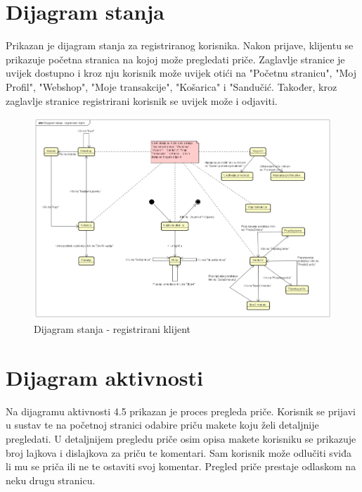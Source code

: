 	\section{Dijagram stanja}
	
		Prikazan je dijagram stanja za registriranog korisnika. Nakon prijave, klijentu se prikazuje početna stranica na kojoj može pregledati priče. Zaglavlje stranice je uvijek dostupno i kroz nju korisnik može uvijek otići na "Početnu stranicu", "Moj Profil", "Webshop", "Moje transakcije", "Košarica" i "Sandučić. Također, kroz zaglavlje stranice registrirani korisnik se uvijek može i odjaviti.
		
		
		\begin{figure}[!h]
			\centering
			\includegraphics[width=1\linewidth]{slike/Dijagram_stanja_registrirani_klijent}
			\caption{Dijagram stanja - registrirani klijent}
			\label{fig:dijagramstanja}
		\end{figure}
		\eject
		
	\section{Dijagram aktivnosti}
		
		 Na dijagramu aktivnosti 4.5 prikazan je proces pregleda priče. Korisnik se prijavi u sustav te na početnoj stranici odabire priču makete koju želi detaljnije pregledati. U detaljnijem pregledu priče osim opisa makete korisniku se prikazuje broj lajkova i dislajkova za priču te komentari. Sam korisnik može odlučiti sviđa li mu se priča ili ne te ostaviti svoj komentar. Pregled priče prestaje odlaskom na neku drugu stranicu.
		
